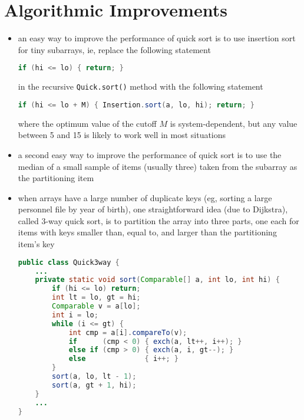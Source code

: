 \documentclass[8pt,a4paper,compress]{beamer}
\begin{document}
\section{Algorithmic Improvements}
\begin{frame}[fragile]
\begin{itemize}
\item an easy way to improve the performance of quick sort is to use insertion sort for tiny subarrays, ie, replace the following statement 
\begin{lstlisting}[language=Java]
if (hi <= lo) { return; }
\end{lstlisting}
in the recursive \lstinline{Quick.sort()} method with the following statement
\begin{lstlisting}[language=Java]
if (hi <= lo + M) { Insertion.sort(a, lo, hi); return; }
\end{lstlisting}
where the optimum value of the cutoff $M$ is system-dependent, but any value between 5 and 15 is likely to work well in most situations

\item a second easy way to improve the performance of quick sort is to use the median of a small sample of items (usually three) taken from the subarray as the partitioning item
\end{itemize}
\end{frame}

\begin{frame}[fragile]
\begin{itemize}
\item when arrays have a large number of duplicate keys (eg, sorting a large personnel file by year of birth), one straightforward idea (due to Dijkstra), called 3-way quick sort, is to partition the array into three parts, one each for items with keys smaller than, equal to, and larger than the partitioning item's key
\begin{lstlisting}[language=Java]
public class Quick3way {
    ...
    private static void sort(Comparable[] a, int lo, int hi) { 
        if (hi <= lo) return;
        int lt = lo, gt = hi;
        Comparable v = a[lo];
        int i = lo;
        while (i <= gt) {
            int cmp = a[i].compareTo(v);
            if      (cmp < 0) { exch(a, lt++, i++); }
            else if (cmp > 0) { exch(a, i, gt--); }
            else              { i++; }
        }
        sort(a, lo, lt - 1);
        sort(a, gt + 1, hi);
    }
    ...
}
\end{lstlisting}
\end{itemize}
\end{frame}
\end{document}
